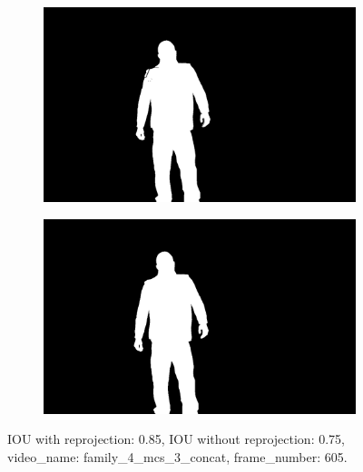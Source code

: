 \begin{figure}
\begin{subfigure}[t]{0.19\textwidth}
\end{subfigure}
\begin{subfigure}[t]{0.19\textwidth}
\centering
\includegraphics[scale=0.07]{good_examples/visual_179486_w_np.png}
\end{subfigure}
\begin{subfigure}[t]{0.19\textwidth}
\centering
\includegraphics[scale=0.07]{good_examples/visual_179486_wo_np.png}
\end{subfigure}
\caption{IOU with reprojection: 0.85, IOU without reprojection: 0.75, video\_name: family\_4\_mcs\_3\_concat, frame\_number: 605.}
\label{fig:reproj_mask}
\end{figure}

